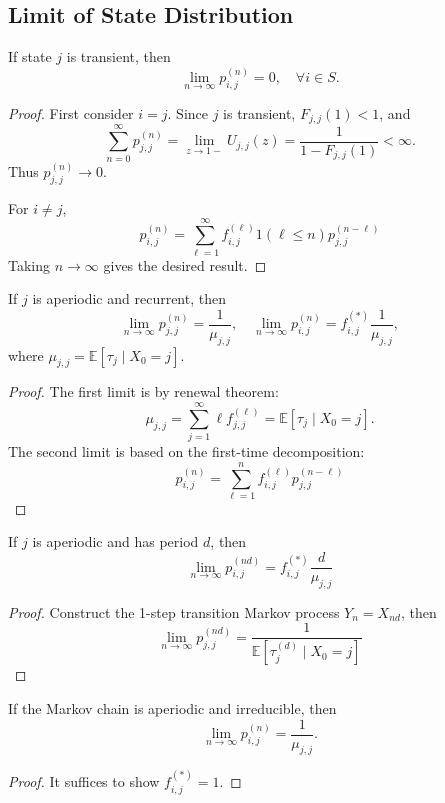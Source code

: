 \subsection{Limit of State Distribution}

\begin{theorem}\label{The:9:3}
If state $j$ is transient, then
\[
\lim_{n\to\infty}p_{i,j}^{(n)}=0,\quad \forall i\in S.
\]
\end{theorem}
\begin{proof}
First consider $i=j$. 
Since $j$ is transient, $F_{j,j}(1)<1$, and 
\[
\sum_{n=0}^\infty p_{j,j}^{(n)}=\lim_{z\to1-}U_{j,j}(z)=\frac{1}{1-F_{j,j}(1)}<\infty.
\]
Thus $p_{j,j}^{(n)}\to0$.

For $i\ne j$, 
\[
p_{i,j}^{(n)}=\sum_{\ell=1}^\infty f_{i,j}^{(\ell)}1(\ell\le n)p_{j,j}^{(n-\ell)}
\]
Taking $n\to\infty$ gives the desired result.
\end{proof}

\begin{theorem}\label{The:9:4}
If $j$ is aperiodic and recurrent, then
\[
\lim_{n\to\infty}p_{j,j}^{(n)}=\frac{1}{\mu_{j,j}},\quad
\lim_{n\to\infty}p_{i,j}^{(n)}=f_{i,j}^{(*)}\frac{1}{\mu_{j,j}},
\]
where $\mu_{j,j}=\mathbb{E}[\tau_j\mid X_0=j]$.
\end{theorem}

\begin{proof}
The first limit is by renewal theorem: 
\[
\mu_{j,j}=\sum_{j=1}^\infty \ell f_{j,j}^{(\ell)}=\mathbb{E}[\tau_j\mid X_0=j].
\]
The second limit is based on the first-time decomposition:
\[
p_{i,j}^{(n)}=\sum_{\ell=1}^n f_{i,j}^{(\ell)}p_{j,j}^{(n-\ell)}
\]

\end{proof}

\begin{theorem}
If $j$ is aperiodic and has period $d$, then
\[
\lim_{n\to\infty}p_{i,j}^{(nd)}=f_{i,j}^{(*)}\frac{d}{\mu_{j,j}}
\]
\end{theorem}
\begin{proof}
Construct the 1-step transition Markov process $Y_n=X_{nd}$, then
\[
\lim_{n\to\infty}p_{j,j}^{(nd)}=\frac{1}{\mathbb{E}[\tau_j^{(d)}\mid X_0=j]}
\]
\end{proof}

\begin{theorem}
If the Markov chain is aperiodic and irreducible, then
\[
\lim_{n\to\infty}p_{i,j}^{(n)}=\frac{1}{\mu_{j,j}}.
\]
\end{theorem}
\begin{proof}
It suffices to show $f_{i,j}^{(*)}=1$.
\end{proof}

